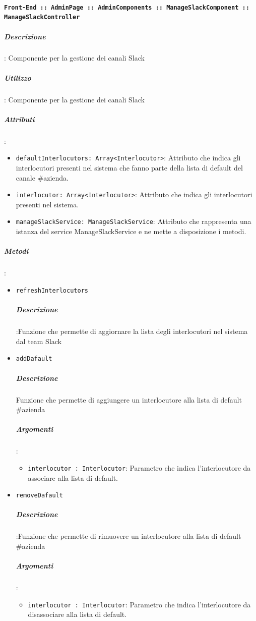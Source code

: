 \documentclass[../DefinizioneDiProdotto_v2.0.0.tex]{subfiles}
\begin{document}
			      \paragraph{\texttt{Front-End :: AdminPage :: AdminComponents :: ManageSlackComponent :: ManageSlackController}}
			      	\subparagraph{Descrizione}: Componente per la gestione dei canali Slack
			      	\subparagraph{Utilizzo}: Componente per la gestione dei canali Slack
			      	\subparagraph{Attributi}:
					\begin{itemize}
						\item \texttt{defaultInterlocutors: Array<Interlocutor>}: Attributo che indica gli interlocutori presenti nel sistema che fanno parte della lista di default del canale \#azienda.
						\item \texttt{interlocutor: Array<Interlocutor>}: Attributo che indica gli interlocutori presenti nel sistema.
						\item \texttt{manageSlackService: ManageSlackService}: Attributo che rappresenta una istanza del service ManageSlackService e ne mette a disposizione i metodi.
					\end{itemize}
	      			\subparagraph{Metodi}:
					\begin{itemize}
						\item \texttt{refreshInterlocutors}
						\subparagraph{Descrizione}:Funzione che permette di aggiornare la lista degli interlocutori nel sistema dal team Slack

						\item \texttt{addDafault}
						\subparagraph{Descrizione}Funzione che permette di aggiungere un interlocutore alla lista di default \#azienda
						\subparagraph{Argomenti}:
						\begin{itemize}
							\item \texttt{interlocutor : Interlocutor}: Parametro che indica l'interlocutore da associare alla lista di default.
						\end{itemize}

						\item \texttt{removeDafault}
						\subparagraph{Descrizione}:Funzione che permette di rimuovere un interlocutore alla lista di default \#azienda
						\subparagraph{Argomenti}:
						\begin{itemize}
							\item \texttt{interlocutor : Interlocutor}: Parametro che indica l'interlocutore da disassociare alla lista di default.
						\end{itemize}
					\end{itemize}
\end{document}
